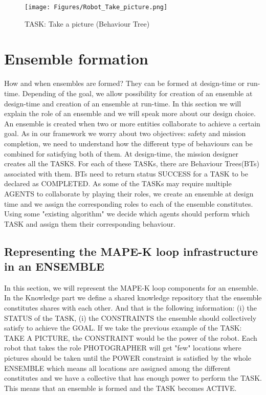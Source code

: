 \documentclass[journal]{IEEEtran}
\theoremstyle{definition}
\begin{document}
\begin{figure}[h]
\texttt{[image: Figures/Robot\_Take\_picture.png]}
\caption{TASK: Take a picture (Behaviour Tree)}
\end{figure}

\section{Ensemble formation}
How and when ensembles are formed?
They can be formed at design-time or run-time.
Depending of the goal, we allow possibility for creation of an ensemble at design-time and creation of an ensemble at run-time.
In this section we will explain the role of an ensemble and we will speak more about our design choice.
An ensemble is created when two or more entities collaborate to achieve a certain goal. As in our framework we worry about two objectives: safety and mission completion, we need to understand how the different type of behaviours can be combined for satisfying both of them.
At design-time, the mission designer creates all the TASKS. For each of these TASKs, there are Behaviour Trees(BTs) associated with them. BTs need to return status SUCCESS for a TASK to be declared as COMPLETED. As some of the TASKs may require multiple AGENTS to collaborate by playing their roles, we create an ensemble at design time and we assign the corresponding roles to each of the ensemble constitutes. Using some "existing algorithm" we decide which agents should perform which TASK and assign them their corresponding behaviour.

\subsection{Representing the MAPE-K loop infrastructure in an ENSEMBLE}

In this section, we will represent the MAPE-K loop components for an ensemble.
In the Knowledge part we define a shared knowledge repository that the ensemble constitutes shares with each other. And that is the following information: 
(i) the STATUS of the TASK, (i) the CONSTRAINTS the ensemble should collectively satisfy to achieve the GOAL. If we take the previous example of the TASK: TAKE A PICTURE, the CONSTRAINT would be the power of the robot. Each robot that takes the role PHOTOGRAPHER will get "few" locations where pictures should be taken until the POWER constraint is satisfied by the whole ENSEMBLE which means all locations are assigned among the different constitutes and we have a collective that has enough power to perform the TASK. 
This means that an ensemble is formed and the TASK becomes ACTIVE.
\end{document}

